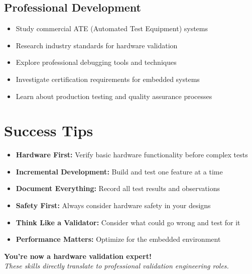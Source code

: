 \documentclass[11pt,a4paper]{article}
\begin{document}
\subsection{Professional Development}
\begin{itemize}
    \item Study commercial ATE (Automated Test Equipment) systems
    \item Research industry standards for hardware validation
    \item Explore professional debugging tools and techniques
    \item Investigate certification requirements for embedded systems
    \item Learn about production testing and quality assurance processes
\end{itemize}

\section{Success Tips}

\begin{itemize}
    \item \textbf{Hardware First:} Verify basic hardware functionality before complex tests
    \item \textbf{Incremental Development:} Build and test one feature at a time
    \item \textbf{Document Everything:} Record all test results and observations
    \item \textbf{Safety First:} Always consider hardware safety in your designs
    \item \textbf{Think Like a Validator:} Consider what could go wrong and test for it
    \item \textbf{Performance Matters:} Optimize for the embedded environment
\end{itemize}

\vspace{1cm}

\begin{center}
\textbf{You're now a hardware validation expert!}\\
\textit{These skills directly translate to professional validation engineering roles.}
\end{center}
\end{document}
